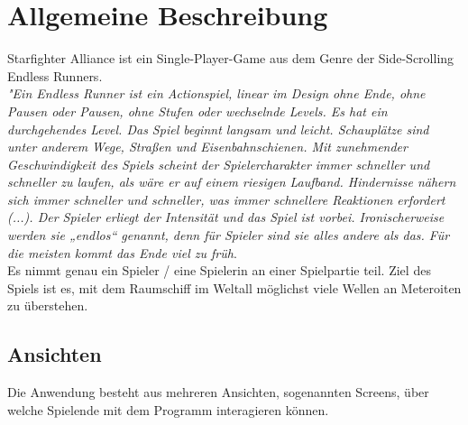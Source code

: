 \documentclass[10pt]{article}
\begin{document}
    \section{Allgemeine Beschreibung}

    Starfighter Alliance ist ein Single-Player-Game aus dem Genre der Side-Scrolling Endless Runners.\\

\noindent \textit{"Ein Endless Runner ist ein Actionspiel, linear im Design ohne Ende, ohne Pausen oder Pausen, ohne Stufen oder wechselnde Levels. Es hat ein durchgehendes Level. Das Spiel beginnt langsam und leicht. Schauplätze sind unter anderem Wege, Straßen und Eisenbahnschienen. Mit zunehmender Geschwindigkeit des Spiels scheint der Spielercharakter immer schneller und schneller zu laufen, als wäre er auf einem riesigen Laufband. Hindernisse nähern sich immer schneller und schneller, was immer schnellere Reaktionen erfordert (...).  Der Spieler erliegt der Intensität und das Spiel ist vorbei. Ironischerweise werden sie „endlos“ genannt, denn für Spieler sind sie alles andere als das. Für die meisten kommt das Ende viel zu früh}.\footnotemark[2]\\

\noindent Es nimmt genau ein Spieler / eine Spielerin an einer Spielpartie teil. Ziel des Spiels ist es, mit dem Raumschiff im Weltall möglichst viele Wellen an Meteroiten zu überstehen.


\newpage

\subsection{Ansichten}

Die Anwendung besteht aus mehreren Ansichten, sogenannten Screens, über welche Spielende mit dem Programm interagieren können.
\end{document}
